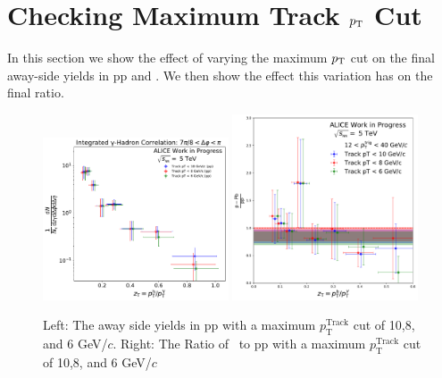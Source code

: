 




\section{Checking Maximum Track $p_{\mathrm{T}}$ Cut}
In this section we show the effect of varying the maximum $p_{\mathrm{T}}$ cut on the final away-side yields in pp and \pPb. We then show the effect this variation has on the final ratio.

\begin{figure}
\includegraphics[width=0.49\textwidth]{G-H_New/FF_Averages_Max_pT_pp.pdf}
\includegraphics[width=0.49\textwidth]{G-H_New/Ratio_FF_Averages_Max_pT.pdf}
\caption{Left: The away side yields in pp with a maximum $p_\mathrm{T}^\mathrm{Track}$ cut of 10,8, and 6 GeV/$c$. Right: The Ratio of \pPb~to pp with a maximum $p_\mathrm{T}^\mathrm{Track}$ cut of 10,8, and 6 GeV/$c$}
\label{fig:FF_pT_Max_pp}
\end{figure}


